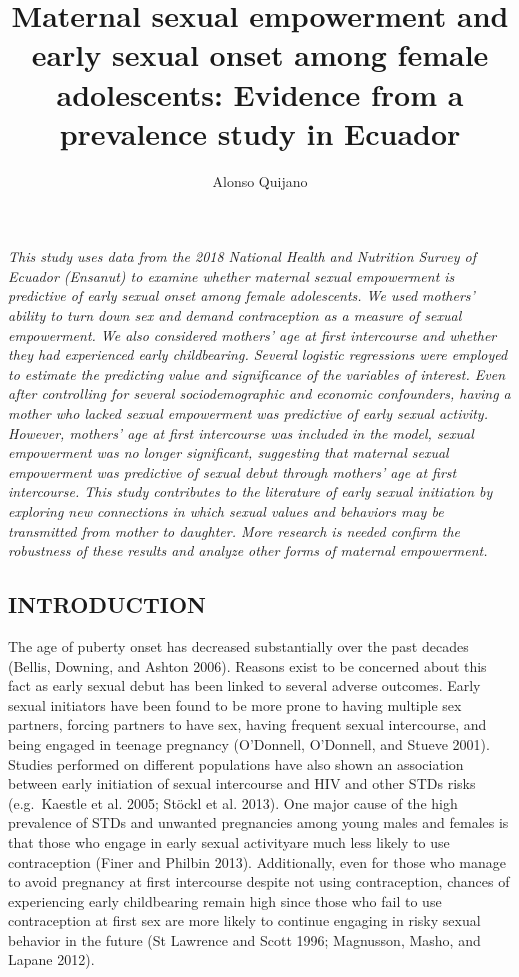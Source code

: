 \documentclass[
]{article}
\title{Maternal sexual empowerment and early sexual onset among female
adolescents: Evidence from a prevalence study in Ecuador}
\author{Alonso Quijano}
\date{}
\begin{document}
\maketitle

\emph{This study uses data from the 2018 National Health and Nutrition
Survey of Ecuador (Ensanut) to examine whether maternal sexual
empowerment is predictive of early sexual onset among female
adolescents. We used mothers' ability to turn down sex and demand
contraception as a measure of sexual empowerment. We also considered
mothers' age at first intercourse and whether they had experienced early
childbearing. Several logistic regressions were employed to estimate the
predicting value and significance of the variables of interest. Even
after controlling for several sociodemographic and economic confounders,
having a mother who lacked sexual empowerment was predictive of early
sexual activity. However, mothers' age at first intercourse was included
in the model, sexual empowerment was no longer significant, suggesting
that maternal sexual empowerment was predictive of sexual debut through
mothers' age at first intercourse. This study contributes to the
literature of early sexual initiation by exploring new connections in
which sexual values and behaviors may be transmitted from mother to
daughter. More research is needed confirm the robustness of these
results and analyze other forms of maternal empowerment.}

\hypertarget{introduction}{%
\subsection{INTRODUCTION}\label{introduction}}

The age of puberty onset has decreased substantially over the past
decades (Bellis, Downing, and Ashton 2006). Reasons exist to be
concerned about this fact as early sexual debut has been linked to
several adverse outcomes. Early sexual initiators have been found to be
more prone to having multiple sex partners, forcing partners to have
sex, having frequent sexual intercourse, and being engaged in teenage
pregnancy (O'Donnell, O'Donnell, and Stueve 2001). Studies performed on
different populations have also shown an association between early
initiation of sexual intercourse and HIV and other STDs risks
(e.g.~Kaestle et al. 2005; Stöckl et al. 2013). One major cause of the
high prevalence of STDs and unwanted pregnancies among young males and
females is that those who engage in early sexual activityare much less
likely to use contraception (Finer and Philbin 2013). Additionally, even
for those who manage to avoid pregnancy at first intercourse despite not
using contraception, chances of experiencing early childbearing remain
high since those who fail to use contraception at first sex are more
likely to continue engaging in risky sexual behavior in the future (St
Lawrence and Scott 1996; Magnusson, Masho, and Lapane 2012).
\end{document}
